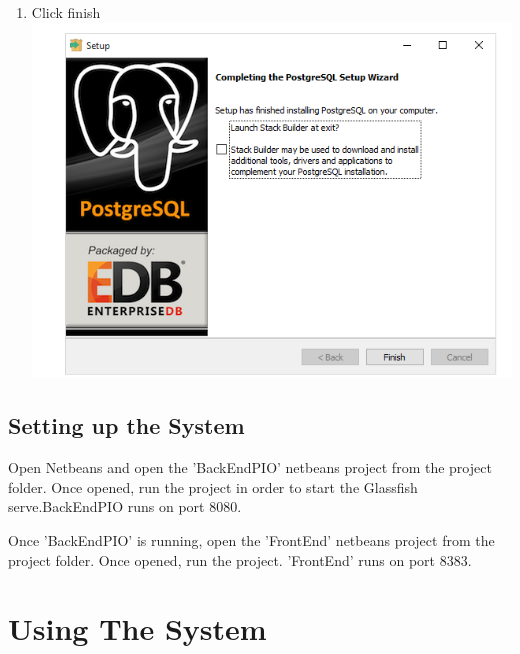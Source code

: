 \documentclass[a4paper,12pt]{article}
\begin{document}
\begin{enumerate}
\item Click finish \\
\includegraphics[width=0.9\linewidth, center]{./Installation/postGresql6.PNG}\\[0.4cm] 

\end{enumerate}

\subsection{Setting up the System}
Open Netbeans and open the 'BackEndPIO' netbeans project from the project folder. Once opened, run the project in order to start the Glassfish serve.BackEndPIO runs on port 8080.

Once 'BackEndPIO' is running, open the 'FrontEnd' netbeans project from the project folder. Once opened, run the project. 'FrontEnd' runs on port 8383.

\section{Using The System}




\end{document}
